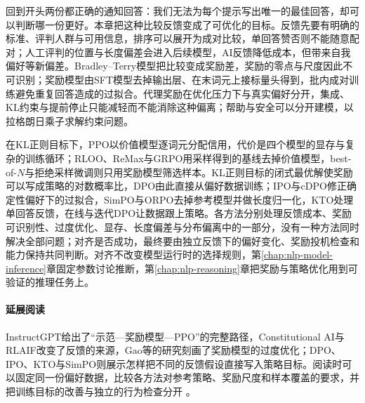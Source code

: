 回到开头两份都正确的通知回答：我们无法为每个提示写出唯一的最佳回答，却可以判断哪一份更好。本章把这种比较反馈变成了可优化的目标。反馈先要有明确的标准、评判人群与可用信息，排序可以展开为成对比较，单回答赞否则不能随意配对；人工评判的位置与长度偏差会进入后续模型，AI反馈降低成本，但带来自我偏好等新偏差。Bradley--Terry模型把比较变成奖励差，奖励的零点与尺度因此不可识别；奖励模型由SFT模型去掉输出层、在末词元上接标量头得到，批内成对训练避免重复回答造成的过拟合。代理奖励在优化压力下与真实偏好分开，集成、KL约束与提前停止只能减轻而不能消除这种偏离；帮助与安全可以分开建模，以拉格朗日乘子求解约束问题。

在KL正则目标下，PPO以价值模型逐词元分配信用，代价是四个模型的显存与复杂的训练循环；RLOO、ReMax与GRPO用采样得到的基线去掉价值模型，best-of-$N$与拒绝采样微调则只用奖励模型筛选样本。KL正则目标的闭式最优解使奖励可以写成策略的对数概率比，DPO由此直接从偏好数据训练；IPO与cDPO修正确定性偏好下的过拟合，SimPO与ORPO去掉参考模型并做长度归一化，KTO处理单回答反馈，在线与迭代DPO让数据跟上策略。各方法分别处理反馈成本、奖励可识别性、过度优化、显存、长度偏差与分布偏离中的一部分，没有一种方法同时解决全部问题；对齐是否成功，最终要由独立反馈下的偏好变化、奖励投机检查和能力保持共同判断。对齐不改变模型运行时的选择规则，第\ref{chap:nlp-model-inference}章固定参数讨论推断，第\ref{chap:nlp-reasoning}章把奖励与策略优化用到可验证的推理任务上。

\paragraph{延展阅读}
InstructGPT给出了“示范—奖励模型—PPO”的完整路径，Constitutional AI与RLAIF改变了反馈的来源，Gao等的研究刻画了奖励模型的过度优化；DPO、IPO、KTO与SimPO则展示怎样把不同的反馈假设直接写入策略目标。阅读时可以固定同一份偏好数据，比较各方法对参考策略、奖励尺度和样本覆盖的要求，并把训练目标的改善与独立的行为检查分开
。
